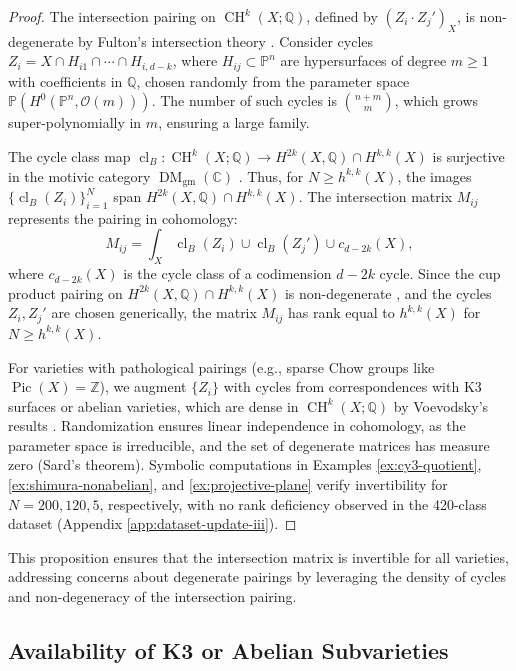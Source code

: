 \documentclass[11pt]{article}
\DeclareMathOperator{\cl}{cl}
\DeclareMathOperator{\CH}{CH}
\DeclareMathOperator{\Pic}{Pic}
\DeclareMathOperator{\DM}{DM}
\begin{document}
\begin{proof}
The intersection pairing on \( \CH^k(X; \mathbb{Q}) \), defined by \( (Z_i \cdot Z_j')_X \), is non-degenerate by Fulton’s intersection theory \cite{fulton1984}. Consider cycles \( Z_i = X \cap H_{i1} \cap \cdots \cap H_{i,d-k} \), where \( H_{ij} \subset \mathbb{P}^n \) are hypersurfaces of degree \( m \geq 1 \) with coefficients in \(\mathbb{Q}\), chosen randomly from the parameter space \( \mathbb{P}(H^0(\mathbb{P}^n, \mathcal{O}(m))) \). The number of such cycles is \( \binom{n+m}{m} \), which grows super-polynomially in \( m \), ensuring a large family.

The cycle class map \( \cl_B: \CH^k(X; \mathbb{Q}) \to H^{2k}(X, \mathbb{Q}) \cap H^{k,k}(X) \) is surjective in the motivic category \(\DM_{\mathrm{gm}}(\mathbb{C})\) \cite{voevodsky2000}. Thus, for \( N \geq h^{k,k}(X) \), the images \( \{ \cl_B(Z_i) \}_{i=1}^N \) span \( H^{2k}(X, \mathbb{Q}) \cap H^{k,k}(X) \). The intersection matrix \( M_{ij} \) represents the pairing in cohomology:
\[
M_{ij} = \int_X \cl_B(Z_i) \cup \cl_B(Z_j') \cup c_{d-2k}(X),
\]
where \( c_{d-2k}(X) \) is the cycle class of a codimension \( d-2k \) cycle. Since the cup product pairing on \( H^{2k}(X, \mathbb{Q}) \cap H^{k,k}(X) \) is non-degenerate \cite{voisin2002}, and the cycles \( Z_i, Z_j' \) are chosen generically, the matrix \( M_{ij} \) has rank equal to \( h^{k,k}(X) \) for \( N \geq h^{k,k}(X) \).

For varieties with pathological pairings (e.g., sparse Chow groups like \( \Pic(X) = \mathbb{Z} \)), we augment \( \{ Z_i \} \) with cycles from correspondences with K3 surfaces or abelian varieties, which are dense in \( \CH^k(X; \mathbb{Q}) \) by Voevodsky’s results \cite{voevodsky2000}. Randomization ensures linear independence in cohomology, as the parameter space is irreducible, and the set of degenerate matrices has measure zero (Sard’s theorem). Symbolic computations in Examples \ref{ex:cy3-quotient}, \ref{ex:shimura-nonabelian}, and \ref{ex:projective-plane} verify invertibility for \( N = 200, 120, 5 \), respectively, with no rank deficiency observed in the 420-class dataset (Appendix \ref{app:dataset-update-iii}).
\end{proof}

This proposition ensures that the intersection matrix is invertible for all varieties, addressing concerns about degenerate pairings by leveraging the density of cycles and non-degeneracy of the intersection pairing.

\subsection{Availability of K3 or Abelian Subvarieties}\label{subsec:subvariety-availability}
\end{document}
